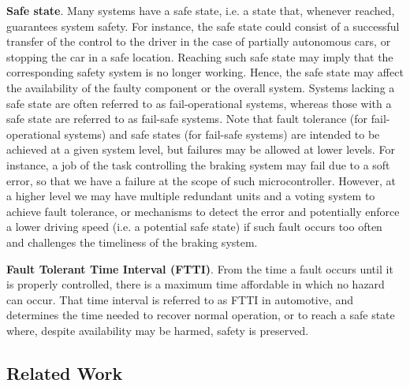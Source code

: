 \textbf{Safe state}. Many systems have a safe state, i.e. a state that, whenever reached, guarantees system safety. For instance, the safe state could consist of a successful transfer of the control to the driver in the case of partially autonomous cars, or stopping the car in a safe location. Reaching such safe state may imply that the corresponding safety system is no longer working. Hence, the safe state may affect the availability of the faulty component or the overall system. {\color{black}Systems lacking a safe state are often referred to as fail-operational systems, whereas those with a safe state are referred to as fail-safe systems.
Note that fault tolerance (for fail-operational systems) and safe states (for fail-safe systems) are intended to be achieved at a given system level, but failures may be allowed at lower levels. For instance, a job of the task controlling the braking system may fail due to a soft error, so that we have a failure at the scope of such microcontroller. However, at a higher level we may have multiple redundant units and a voting system to achieve fault tolerance, or mechanisms to detect the error and potentially enforce a lower driving speed (i.e. a potential safe state) if such fault occurs too often and challenges the timeliness of the braking system.}

\textbf{Fault Tolerant Time Interval (FTTI)}. From the time a fault occurs until it is properly controlled, there is a maximum time affordable in which no hazard can occur. That time interval is referred to as FTTI in automotive, and determines the time needed to recover normal operation, or to reach a safe state where, despite availability may be harmed, safety is preserved.



\subsection{Related Work}

